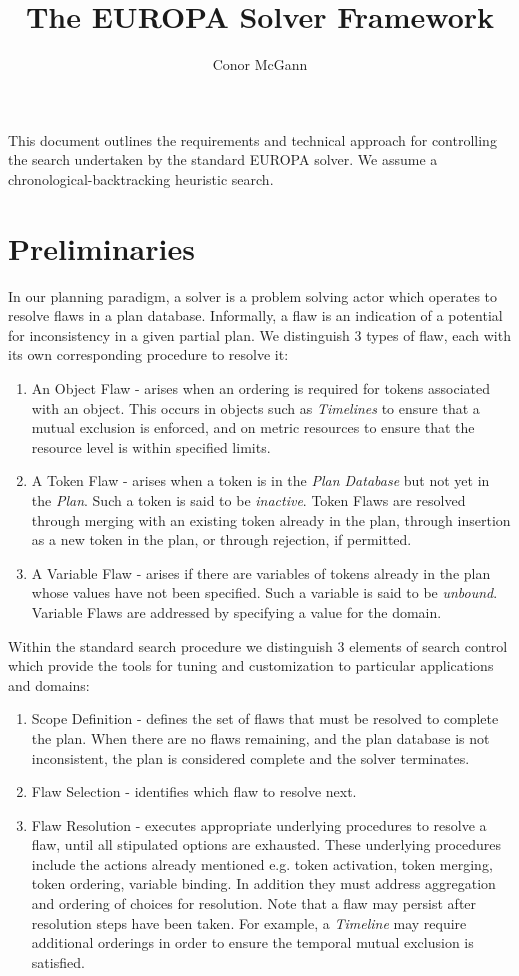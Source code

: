 \documentclass[10pt, letterpaper, oneside]{article}
\author{Conor McGann}
\title{The EUROPA Solver Framework}
\begin{document}
\maketitle

This document outlines the requirements and technical approach for controlling the search undertaken by the standard EUROPA solver. We assume a chronological-backtracking heuristic search.

\section{Preliminaries}

In our planning paradigm, a solver is a problem solving actor which operates to resolve flaws in a plan database. Informally, a flaw is an indication of a potential for inconsistency in a given partial plan. We distinguish 3 types of flaw, each with its own corresponding  procedure to resolve it:
\begin{enumerate}
\item An Object Flaw - arises when an ordering is required for tokens associated with an object. This occurs in objects such as {\em Timelines} to ensure that a mutual exclusion is enforced, and on metric resources to ensure that the resource level is within specified limits.
\item A Token Flaw - arises when a token is in the {\em Plan Database} but not yet in the {\em Plan}. Such a token is said to be {\em inactive}. Token Flaws are resolved through merging with an existing token already in the plan, through insertion as a new token in the plan, or through rejection, if permitted.
\item A Variable Flaw - arises if there are variables of tokens already in the plan whose values have not been specified. Such a variable is said to be {\em unbound}. Variable Flaws are addressed by specifying a value for the domain. 
\end{enumerate}

Within the standard search procedure we distinguish 3 elements of search control which provide the tools for tuning and customization to particular applications and domains:
\begin{enumerate}
\item Scope Definition - defines the set of flaws that must be resolved to complete the plan. When there are no flaws remaining, and the plan database is not inconsistent, the plan is considered complete and the solver terminates.
\item Flaw Selection - identifies which flaw to resolve next.
\item Flaw Resolution - executes appropriate underlying procedures to resolve a flaw, until all stipulated options are exhausted. These underlying procedures include the actions already mentioned e.g. token activation, token merging, token ordering, variable binding. In addition they must address aggregation and ordering of choices for resolution. Note that a flaw may persist after resolution steps have been taken. For example, a {\em Timeline} may require additional orderings in order to ensure the temporal mutual exclusion is satisfied.
\end{enumerate}
\end{document}

